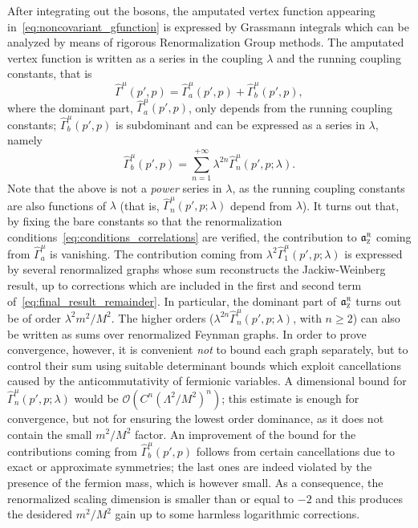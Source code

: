 \documentclass[a4paper, 11pt]{article}
\newcommand{\gyr}{\mathfrak{a}}								%
\newcommand{\rgyr}{\gyr_\textsc{z}^\textsc{r}}
\newcommand{\BigO}{\mathcal{O}}								%
\theoremstyle{thm}
\begin{document}
After integrating out the bosons, the amputated vertex function appearing in~\eqref{eq:noncovariant_gfunction} is expressed by Grassmann integrals which can be analyzed by means of rigorous Renormalization Group methods. The amputated vertex function is written as a series in the coupling $\lambda$ and the running coupling constants, that is
\begin{equation}
\label{eq:vertex_splitting}
\hat{\Gamma}^\mu(p', p)=
\hat{\Gamma}_a^\mu(p', p)+\hat{\Gamma}^\mu_b(p', p),
\end{equation}
where the dominant part, $\hat{\Gamma}_a^\mu(p', p)$, only depends from the running coupling constants; $\hat{\Gamma}^\mu_b(p', p)$ is subdominant and can be expressed as a series in $\lambda$, namely
\begin{equation}
\label{eq:subdominant_vertex_expansion}
\hat{\Gamma}^\mu_b(p', p)=\sum_{n=1}^{+\infty} \lambda^{2 n} \hat{\Gamma}_n^\mu(p', p; \lambda).
\end{equation}
Note that the above is not a \emph{power} series in $\lambda$, as the running coupling constants are also functions of $\lambda$ (that is, $\hat{\Gamma}_n^\mu(p', p; \lambda)$ depend from $\lambda$).
It turns out that, by fixing the bare constants so that the renormalization conditions~\eqref{eq:conditions_correlations} are verified, the contribution to $\rgyr$ coming from $\hat{\Gamma}_a^\mu$ is vanishing. The contribution coming from $\lambda^2 \hat{\Gamma}_1^\mu(p', p; \lambda)$ is expressed by several renormalized graphs whose sum reconstructs the Jackiw-Weinberg result, up to corrections which are included in the first
and second term of~\eqref{eq:final_result_remainder}. In particular, the dominant part of $\rgyr$ turns out be of order $\lambda^2 m^2/M^2$. The higher orders ($\lambda^{2 n} \hat{\Gamma}_n^\mu(p', p; \lambda)$, with $n\ge 2$) can also be written as sums
over renormalized Feynman graphs. In order to prove convergence, however, it is convenient
\emph{not} to bound each graph separately, but to control their sum using suitable determinant bounds which exploit cancellations caused by the anticommutativity of fermionic variables. A dimensional bound for $\hat{\Gamma}_n^\mu(p', p; \lambda)$ would be
$\BigO(C^n (\Lambda^2/M^2)^n)$; this estimate is enough for convergence, but not for ensuring the lowest order dominance, as it does not contain the small $m^2/M^2$ factor. An improvement of the bound for the contributions coming from $\hat{\Gamma}^\mu_b(p', p)$ follows from certain cancellations due to exact or approximate symmetries; the last ones are indeed violated by the presence of the fermion mass, which is however small. As a consequence, the renormalized scaling dimension is smaller than or equal to $-2$ and this produces the desidered $m^2/M^2$ gain up to some harmless logarithmic corrections.
\end{document}
